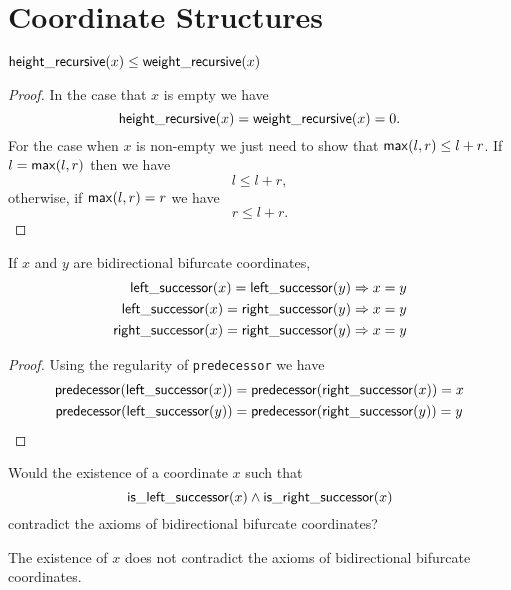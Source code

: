 \chapter{Coordinate Structures}

\begin{lemma}
	$\mathsf{height\_recursive}(x) \leq \mathsf{weight\_recursive}(x)$
\end{lemma}

\begin{proof}
	In the case that $x$ is empty we have
	\[ \mathsf{height\_recursive}(x) = \mathsf{weight\_recursive}(x) = 0. \]
	For the case when $x$ is non-empty we just need to show that
	$\mathsf{max}(l, r) \leq l + r$. If $l = \mathsf{max}(l, r)$ then we have
	\[ l \leq l + r, \]
	otherwise, if $\mathsf{max}(l, r) = r$ we have
	\[ r \leq l + r. \]
\end{proof}

\begin{lemma}
	If $x$ and $y$ are bidirectional bifurcate coordinates,
	\begin{align*}
		\mathsf{left\_successor}(x) = \mathsf{left\_successor}(y) &\Rightarrow x = y\\
		\mathsf{left\_successor}(x) = \mathsf{right\_successor}(y) &\Rightarrow x = y\\
		\mathsf{right\_successor}(x) = \mathsf{right\_successor}(y) &\Rightarrow x = y
	\end{align*}
\end{lemma}

\begin{proof}
	Using the regularity of \verb|predecessor| we have
	\begin{align*}
		\mathsf{predecessor}(\mathsf{left\_successor}(x)) &= \mathsf{predecessor}(\mathsf{right\_successor}(x)) = x\\
		\mathsf{predecessor}(\mathsf{left\_successor}(y)) &= \mathsf{predecessor}(\mathsf{right\_successor}(y)) = y
	\end{align*}
\end{proof}

\begin{exercise}
	Would the existence of a coordinate $x$ such that
	\[ \mathsf{is\_left\_successor}(x) \wedge \mathsf{is\_right\_successor}(x) \]
	contradict the axioms of bidirectional bifurcate coordinates?
\end{exercise}

\begin{solution}
	The existence of $x$ does not contradict the axioms of bidirectional bifurcate coordinates.
\end{solution}


